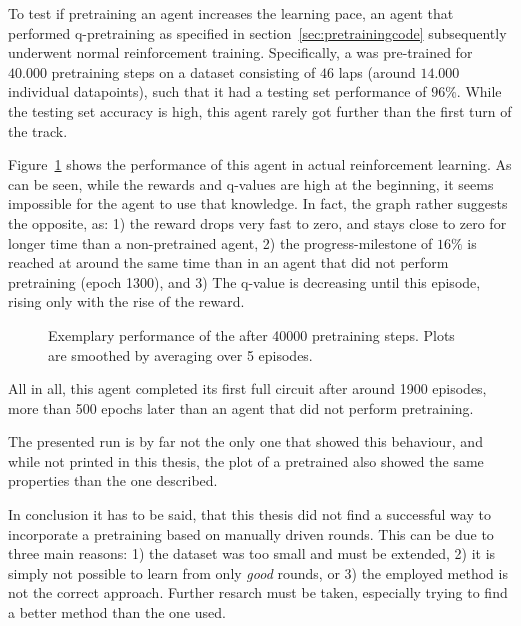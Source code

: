 To test if pretraining an agent increases the learning pace, an agent that performed q-pretraining as specified in section~\ref{sec:pretrainingcode} subsequently underwent normal reinforcement training. Specifically, a  was pre-trained for $40.000$ pretraining steps on a dataset consisting of $46$ laps (around $14.000$ individual datapoints), such that it had a testing set performance of $96\%$. While the testing set accuracy is high, this agent rarely got further than the first turn of the track.

Figure~\ref{fig:ddpg_incorpPre} shows the performance of this agent in actual reinforcement learning. As can be seen, while the rewards and q-values are high at the beginning, it seems impossible for the agent to use that knowledge. In fact, the graph rather suggests the opposite, as: 1) the reward drops very fast to zero, and stays close to zero for longer time than a non-pretrained agent, 2) the progress-milestone of $16\%$ is reached at around the same time than in an agent that did not perform pretraining (epoch 1300), and 3) The q-value is decreasing until this episode, rising only with the rise of the reward.

\begin{figure}[h]
	{%
		\setlength{\fboxsep}{0pt}%
		\setlength{\fboxrule}{1pt}%
	}%
	\centering
	\caption[Exemplary performance of the  after 40000 pretrain steps]{Exemplary performance of the  after 40000 pretraining steps. Plots are smoothed by averaging over 5 episodes.}
	\label{fig:ddpg_incorpPre}
\end{figure}

All in all, this agent completed its first full circuit after around 1900 episodes, more than 500 epochs later than an agent that did not perform pretraining. 

The presented run is by far not the only one that showed this behaviour, and while not printed in this thesis, the plot of a pretrained  also showed the same properties than the one described.

In conclusion it has to be said, that this thesis did not find a successful way to incorporate a pretraining based on manually driven rounds. This can be due to three main reasons: 1) the dataset was too small and must be extended, 2) it is simply not possible to learn from only \textit{good} rounds, or 3) the employed method is not the correct approach. Further resarch must be taken, especially trying to find a better method than the one used.

